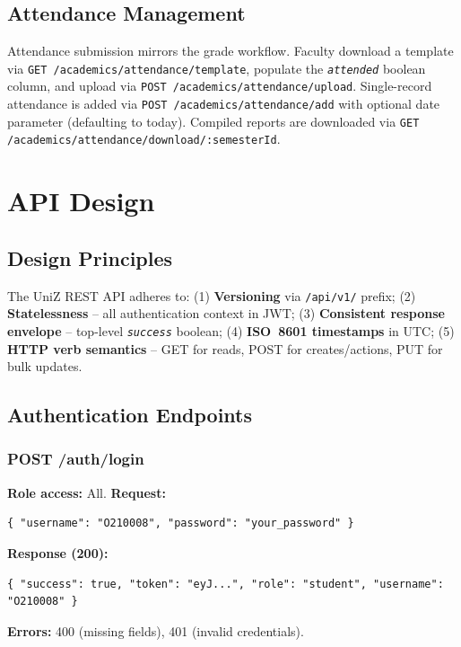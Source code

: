 \documentclass[12pt,a4paper]{report}
\newcommand{\api}[1]{\texttt{\small #1}}
\newcommand{\field}[1]{\texttt{\textit{#1}}}
\begin{document}
\section{Attendance Management}

Attendance submission mirrors the grade workflow. Faculty download a template via \api{GET /academics/attendance/template}, populate the \field{attended} boolean column, and upload via \api{POST /academics/attendance/upload}. Single-record attendance is added via \api{POST /academics/attendance/add} with optional date parameter (defaulting to today). Compiled reports are downloaded via \api{GET /academics/attendance/download/:semesterId}.

\chapter{API Design}

\section{Design Principles}

The UniZ REST API adheres to: (1) \textbf{Versioning} via \api{/api/v1/} prefix; (2) \textbf{Statelessness} -- all authentication context in JWT; (3) \textbf{Consistent response envelope} -- top-level \field{success} boolean; (4) \textbf{ISO~8601 timestamps} in UTC; (5) \textbf{HTTP verb semantics} -- GET for reads, POST for creates/actions, PUT for bulk updates.

\section{Authentication Endpoints}

\subsection{POST /auth/login}

\textbf{Role access:} All. \textbf{Request:}
\begin{lstlisting}[caption={Login request},label={lst:login}]
{ "username": "O210008", "password": "your_password" }
\end{lstlisting}
\textbf{Response (200):}
\begin{lstlisting}[caption={Login response},label={lst:loginres}]
{ "success": true, "token": "eyJ...", "role": "student", "username": "O210008" }
\end{lstlisting}
\textbf{Errors:} 400 (missing fields), 401 (invalid credentials).
\end{document}
